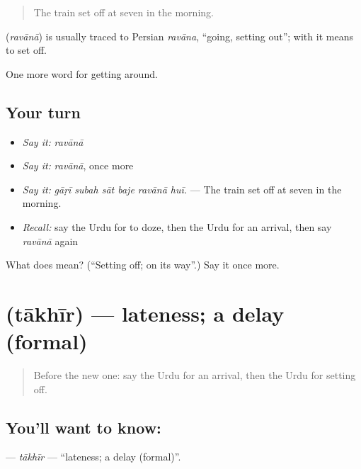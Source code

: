 \begin{quote}
The train set off at seven in the morning.
\end{quote}

\begin{cousinweb}
\textbf{} (\emph{ravānā}) is usually traced to Persian \emph{ravāna}, \textquotedblleft{}going, setting out\textquotedblright{}; with \textbf{} it means to set off.
\end{cousinweb}

\begin{grammarlens}[title={What you've built}]
One more word for getting around.
\end{grammarlens}

\subsection*{Your turn}
\begin{itemize}
\raggedright
  \item \emph{Say it:} \emph{ravānā}
  \item \emph{Say it:} \emph{ravānā}, once more
  \item \emph{Say it:} \emph{gāṛī subah sāt baje ravānā huī.} — The train set off at seven in the morning.
  \item \emph{Recall:} say the Urdu for to doze, then the Urdu for an arrival, then say \emph{ravānā} again
\end{itemize}

\begin{tcolorbox}[breakable,colback=teal!4,colframe=teal!35!black,title={Before you move on}]
What does  mean? (\textquotedblleft{}Setting off; on its way\textquotedblright{}.) Say it once more.
\end{tcolorbox}
\section[\texorpdfstring{\ur{تاخیر} (tākhīr)}{تاخیر (tākhīr)}]{ (tākhīr) — lateness; a delay (formal)}

\label{lesson:UR-C390-takhir}



\begin{quote}
Before the new one: say the Urdu for an arrival, then the Urdu for setting off.
\end{quote}

\subsection*{You'll want to know: }
\textbf{} — \emph{tākhīr} — \textquotedblleft{}lateness; a delay (formal)\textquotedblright{}.

